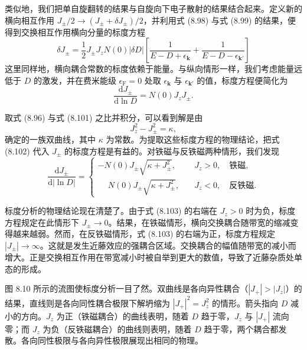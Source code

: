 类似地，我们把单自旋翻转的结果与自旋向下电子散射的结果结合起来。定义新的横向相互作用 $J_{\pm}/2 \to (J_{\pm} + \delta J_{\pm})/2$，并利用式 (8.98) 与式 (8.99) 的结果，便得到交换相互作用横向分量的标度方程
\begin{equation*}
\delta J_{\pm} = \frac{1}{2} J_{\pm}J_{z} N(0)|\delta D| \left[ \frac{1}{E-D+\epsilon_{\mathbf{k}}} + \frac{1}{E-D-\epsilon_{\mathbf{k}'}} \right]
\tag{8.100}
\end{equation*}
这里同样地，横向耦合常数的标度依赖于能量。与纵向情形一样，我们考虑能量远低于 $D$ 的激发，并在费米能级 $\epsilon_{\mathrm{F}} = 0$ 处取 $\epsilon_{\mathbf{k}}$ 与 $\epsilon_{\mathbf{k}'}$ 的值，标度方程便简化为
\begin{equation*}
\frac{\mathrm{d}J_{\pm}}{\mathrm{d}\ln D} = N(0)J_{z}J_{\pm}.
\tag{8.101}
\end{equation*}

取式 (8.96) 与式 (8.101) 之比并积分，可以看到解是由
\begin{equation*}
J_{z}^{2} - J_{\pm}^{2} = \kappa,
\tag{8.102}
\end{equation*}
确定的一族双曲线，其中 $\kappa$ 为常数。为提取这些标度方程的物理结论，把式 (8.102) 代入 $J_{\pm}$ 的标度方程是有益的。对铁磁与反铁磁两种情形，我们发现
\begin{equation*}
\frac{\mathrm{d}J_{\pm}}{\mathrm{d}|\ln D|} =
\begin{cases}
-N(0)J_{\pm}\sqrt{\kappa + J_{\pm}^{2}}, & \quad J_{z} > 0, \quad \text{铁磁},\\
\phantom{-}N(0)J_{\pm}\sqrt{\kappa + J_{\pm}^{2}}, & \quad J_{z} < 0, \quad \text{反铁磁}.
\end{cases}
\tag{8.103}
\end{equation*}

标度分析的物理结论现在清楚了。由于式 (8.103) 的右端在 $J_{z} > 0$ 时为负，标度方程规定在此情形下 $J_{\pm} \to 0$。结果，在铁磁情形，横向交换耦合随带宽的缩减变得越来越弱。然而，在反铁磁情形，式 (8.103) 的右端为正，标度方程规定 $|J_{\pm}| \to \infty$。这就是发生近藤效应的强耦合区域。交换耦合的幅值随带宽的减小而增大。正是交换相互作用在带宽减小时被自举到更大的数值，导致了近藤杂质处单态的形成。

图 8.10 所示的流图使标度分析一目了然。双曲线是各向异性耦合（$|J_{+}| > |J_{z}|$）的结果，直线则是各向同性耦合极限下解坍缩为 $|J_{+}|^{2} = J_{z}^{2}$ 的情形。箭头指向 $D$ 减小的方向。$J_{z}$ 为正（铁磁耦合）的曲线表明，随着 $D$ 趋于零，$J_{z}$ 与 $|J_{+}|$ 流向零；而 $J_{z}$ 为负（反铁磁耦合）的曲线则表明，随着 $D$ 趋于零，两个耦合都发散。各向同性极限与各向异性极限展现出相同的物理。


